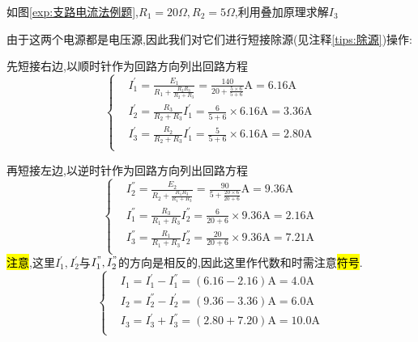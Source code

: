\begin{example}
    如图\ref{exp:支路电流法例题},$R_1=20\Omega ,R_2=5\Omega $,利用叠加原理求解$I_3$
\end{example}
\begin{solution}
    由于这两个电源都是电压源,因此我们对它们进行短接除源(见注释\ref{tips:除源})操作:

    先短接右边,以顺时针作为回路方向列出回路方程
    \begin{equation*}
        \left\{ \begin{aligned}
            &I_{1}^{'}=\frac{E_1}{R_1+\frac{R_2R_3}{R_2+R_3}}=\frac{140}{20+\frac{5\times 6}{5+6}}\mathrm{A}=6.16\mathrm{A}\\
            &I_{2}^{'}=\frac{R_3}{R_2+R_3}I_{1}^{'}=\frac{6}{5+6}\times 6.16\mathrm{A}=3.36\mathrm{A}\\
            &I_{3}^{'}=\frac{R_2}{R_2+R_3}I_{1}^{'}=\frac{5}{5+6}\times 6.16\mathrm{A}=2.80\mathrm{A}\\
        \end{aligned} \right. 
    \end{equation*}

    再短接左边,以逆时针作为回路方向列出回路方程
    \begin{equation*}
        \left\{ \begin{aligned}
            &I_{2}^{''}=\frac{E_2}{R_2+\frac{R_1R_3}{R_1+R_3}}=\frac{90}{5+\frac{20\times 6}{20+6}}\mathrm{A}=9.36\mathrm{A}\\
            &I_{1}^{''}=\frac{R_3}{R_1+R_3}I_{2}^{''}=\frac{6}{20+6}\times 9.36\mathrm{A}=2.16\mathrm{A}\\
            &I_{3}^{''}=\frac{R_1}{R_1+R_3}I_{2}^{''}=\frac{20}{20+6}\times 9.36\mathrm{A}=7.21\mathrm{A}\\
        \end{aligned} \right. 
    \end{equation*}
    \hl{注意},这里$I_{1}^{'},I_{2}^{'}$与$I_{1}^{"},I_{2}^{"}$的方向是相反的,因此这里作代数和时需注意\hl{符号}.
    \begin{equation*}
        \left\{ \begin{aligned}
            &I_1=I_{1}^{'}-I_{1}^{''}=(6.16-2.16)\mathrm{A}=4.0\mathrm{A}\\
            &I_2=I_{2}^{''}-I_{2}^{'}=(9.36-3.36)\mathrm{A}=6.0\mathrm{A}\\
            &I_3=I_{3}^{'}+I_{3}^{''}=(2.80+7.20)\mathrm{A}=10.0\mathrm{A}\\
        \end{aligned} \right. 
    \end{equation*}
\end{solution}

